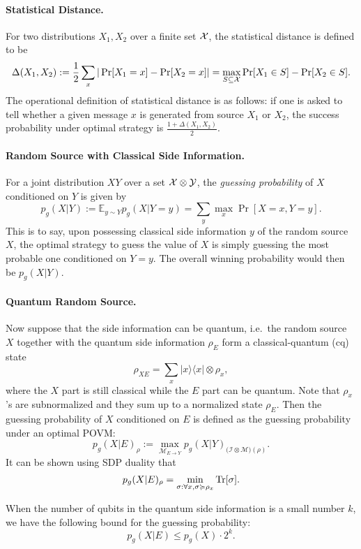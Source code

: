     \paragraph{Statistical Distance.} For two distributions $X_1, X_2$ over a finite set $\mathcal{X}$, the statistical distance is defined to be
        $$\Delta(X_1,X_2):=\frac{1}{2}\sum_x|\Pr[X_1=x]-\Pr[X_2=x]|=\max_{S\subseteq \mathcal{X}}\Pr[X_1\in S]-\Pr[X_2\in S].$$
        The operational definition of statistical distance is as follows: if one is asked to tell whether a given message $x$ is generated from source $X_1$ or $X_2$, the success probability under optimal strategy is $\frac{1+\Delta(X_1,X_2)}{2}$.
    \paragraph{Random Source with Classical Side Information.} For a joint distribution $XY$ over a set $\mathcal{X}\otimes \mathcal{Y}$, the \emph{guessing probability} of $X$ conditioned on $Y$ is given by
        $$p_g(X|Y):=\mathbb{E}_{y\sim Y}p_g(X|Y=y)=\sum_{y}\max_x \Pr[X=x,Y=y].$$
        This is to say, upon possessing classical side information $y$ of the random source $X$, the optimal strategy to guess the value of $X$ is simply guessing the most probable one conditioned on $Y=y$. The overall winning probability would then be $p_g(X|Y)$.
    \paragraph{Quantum Random Source.} Now suppose that the side information can be quantum, i.e.\ the random source $X$ together with the quantum side information $\rho_E$ form a classical-quantum (cq) state
        $$\rho_{XE}=\sum_{x}|x\rangle\langle x|\otimes \rho_x,$$
        where the $X$ part is still classical while the $E$ part can be quantum. Note that $\rho_x$'s are subnormalized and they sum up to a normalized state $\rho_E$. Then the guessing probability of $X$ conditioned on $E$ is defined as the guessing probability under an optimal POVM:
        $$p_g(X|E)_\rho := \max_{\mathcal{M}_{E\rightarrow Y}}p_g(X|Y)_{(\mathcal{I}\otimes\mathcal{M)(\rho)}}.$$
        It can be shown using SDP duality that 
        $$p_g(X|E)_\rho = \min_{\sigma: \forall x, \sigma\succcurlyeq \rho_x}\textnormal{Tr}[\sigma].$$

        When the number of qubits in the quantum side information is a small number $k$, we have the following bound for the guessing probability:
        $$p_g(X|E)\leq p_g(X)\cdot 2^{k}.$$
